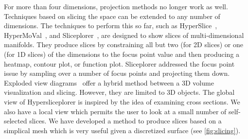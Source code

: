 For more than four dimensions, 
projection methods no longer work as well.  Techniques based on slicing the
space can be extended to any number of dimensions.  The techniques to perform
this so far, such as HyperSlice~\cite{Wijk:1993},
HyperMoVal~\cite{Piringer:2010}, and Sliceplorer~\cite{Torsney-Weir:2017a},
are designed to show slices of multi-dimensional manifolds.
They produce slices by
constraining all but two (for 2D slices) or one (for 1D slices) of the
dimensions to the focus point value and then producing a heatmap, contour plot,
or function plot. Sliceplorer addressed the focus point issue by sampling over
a number of focus points and projecting them down.  Exploded view
diagrams~\cite{Karpenko:2010} offer a hybrid method between a 3D volume
visualization and slicing.  However, they 
are limited to 3D objects. 
The global view of Hypersliceplorer is inspired by the idea of examining
cross sections. We also have a local
view which permits the user to look at a small number of self-selected slices.
We have developed a method to produce slices based on a simplical mesh which
is very useful given a discretized surface (see \autoref{fig:slicing}). 

